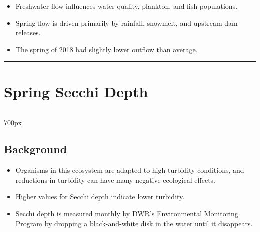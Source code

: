 \documentclass[
]{book}
\providecommand{\tightlist}{%
  \setlength{\itemsep}{0pt}\setlength{\parskip}{0pt}}
\begin{document}
\begin{itemize}
\tightlist
\item
  Freshwater flow influences water quality, plankton, and fish populations.
\item
  Spring flow is driven primarily by rainfall, snowmelt, and upstream dam releases.
\item
  The spring of 2018 had slightly lower outflow than average.
\end{itemize}

\begin{center}\rule{0.5\linewidth}{0.5pt}\end{center}

\hypertarget{spring-secchi-depth}{%
\section{Spring Secchi Depth}\label{spring-secchi-depth}}

\begin{column}{700px\textwidth}
\hypertarget{background}{%
\subsection{Background}\label{background}}

\begin{itemize}
\tightlist
\item
  Organisms in this ecosystem are adapted to high turbidity conditions, and reductions in turbidity can have many negative ecological effects.
\item
  Higher values for Secchi depth indicate lower turbidity.
\item
  Secchi depth is measured monthly by DWR's \href{https://emp.baydeltalive.com/wiki/12297}{Environmental Monitoring Program} by dropping a black-and-white disk in the water until it disappears.
\end{itemize}
\end{column}
\end{document}
